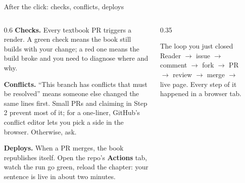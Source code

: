 \documentclass[9pt,aspectratio=169]{beamer}
\begin{document}
\begin{frame}{After the click: checks, conflicts, deploys}
    \begin{columns}[T]
        \begin{column}{0.6\textwidth}
            \textbf{Checks.} Every textbook PR triggers a render. A green check means the book still builds with your change; a red one means the build broke and you need to diagnose where and why.

            \medskip

            \textbf{Conflicts.} ``This branch has conflicts that must be resolved'' means someone else changed the same lines first. Small PRs and claiming in Step 2 prevent most of it; for a one-liner, GitHub's conflict editor lets you pick a side in the browser. Otherwise, ask.

            \medskip

            \textbf{Deploys.} When a PR merges, the book republishes itself. Open the repo's \textbf{Actions} tab, watch the run go green, reload the chapter: your sentence is live in about two minutes.
        \end{column}
        \begin{column}{0.35\textwidth}
            \begin{alertblock}{The loop you just closed}
                \small Reader $\rightarrow$ issue $\rightarrow$ comment $\rightarrow$ fork $\rightarrow$ PR $\rightarrow$ review $\rightarrow$ merge $\rightarrow$ live page. Every step of it happened in a browser tab.
            \end{alertblock}
        \end{column}
    \end{columns}
\end{frame}
\end{document}
